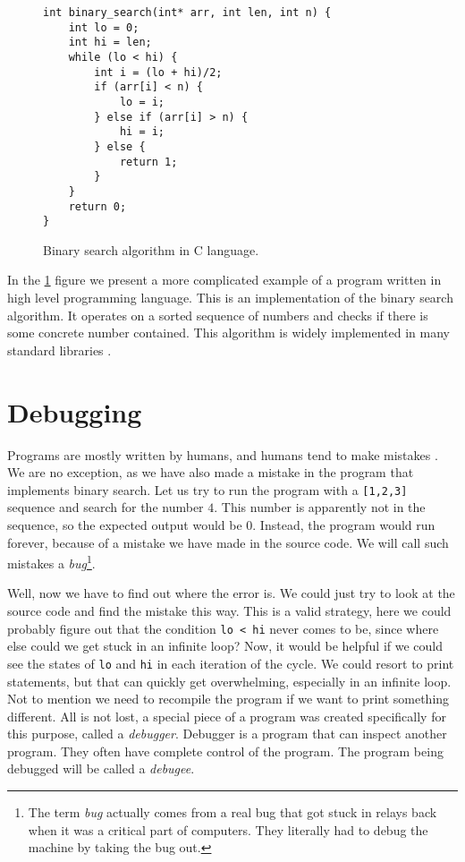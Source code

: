 \begin{figure}[H]\label{fig:binary-search}
    \begin{verbatim}
int binary_search(int* arr, int len, int n) {
    int lo = 0;
    int hi = len;
    while (lo < hi) {
        int i = (lo + hi)/2;
        if (arr[i] < n) {
            lo = i;
        } else if (arr[i] > n) {
            hi = i;
        } else {
            return 1;
        }
    }
    return 0;
}
    \end{verbatim}
    \caption{Binary search algorithm in C language.}
\end{figure}

In the \ref{fig:binary-search} figure we present a more complicated example of
a program written in high level programming language. This is an implementation
of the binary search algorithm. It operates on a sorted sequence of numbers and
checks if there is some concrete number contained. This algorithm is widely
implemented in many standard libraries .

\section{Debugging}
Programs are mostly written by humans, and humans tend to make mistakes
\cite{human-error}. We are no exception, as we have also made a mistake in the
program that implements binary search. Let us try to run the program with a
\texttt{[1,2,3]} sequence and search for the number $4$. This number is
apparently not in the sequence, so the expected output would be $0$. Instead,
the program would run forever, because of a mistake we have made in the source
code. We will call such mistakes a \textit{bug}\footnote{The term \textit{bug}
actually comes from a real bug that got stuck in relays back when it was a
critical part of computers. They literally had to debug the machine by taking
the bug out.}.

Well, now we have to find out where the error is. We could just try to look at
the source code and find the mistake this way. This is a valid strategy, here
we could probably figure out that the condition \texttt{lo < hi} never comes to
be, since where else could we get stuck in an infinite loop? Now, it would be
helpful if we could see the states of \texttt{lo} and \texttt{hi} in each
iteration of the cycle. We could resort to print statements, but that can
quickly get overwhelming, especially in an infinite loop. Not to mention we
need to recompile the program if we want to print something different. All is
not lost, a special piece of a program was created specifically for this
purpose, called a \textit{debugger}. Debugger is a program that can inspect
another program. They often have complete control of the program. The program
being debugged will be called a \textit{debugee}.

